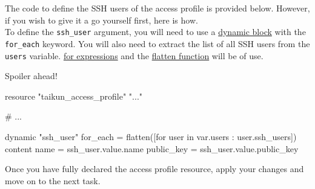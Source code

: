 \begin{note}
The code to define the SSH users of the access profile is provided below.
However, if you wish to give it a go yourself first, here is how.\\

To define the \texttt{ssh\_user} argument, you will need to use a
\href{https://www.terraform.io/docs/language/expressions/dynamic-blocks.html}{dynamic block}
with the \texttt{for\_each} keyword.
You will also need to extract the list of all SSH users from the \texttt{users} variable.
\href{https://www.terraform.io/docs/language/expressions/for.html}{for expressions} and
the \href{https://www.terraform.io/docs/language/functions/flatten.html}{flatten function}
will be of use.
\end{note}
\vfill
{\Large{Spoiler ahead!}}
\vfill
\begin{tf}
resource "taikun_access_profile" "..." {

  # ...
  
  dynamic "ssh_user" {
    for_each = flatten([for user in var.users : user.ssh_users])
    content {
      name       = ssh_user.value.name
      public_key = ssh_user.value.public_key
    }
  }
}
\end{tf}

Once you have fully declared the access profile resource, apply your changes and move on to the next task.
